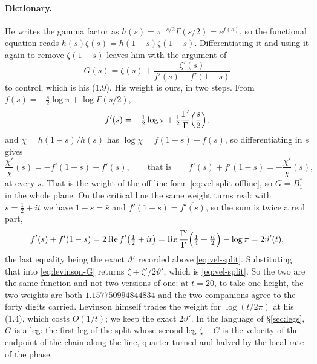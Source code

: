 \documentclass[11pt]{article}
\theoremstyle{definition}
\begin{document}
\paragraph{Dictionary.} He writes the gamma factor as
$h(s)=\pi^{-s/2}\Gamma(s/2)=e^{f(s)}$, so the functional equation reads
$h(s)\zeta(s)=h(1-s)\zeta(1-s)$. Differentiating it and using it again to
remove $\zeta(1-s)$ leaves him with the argument of
\begin{equation}\label{eq:levinson-G}
G(s)=\zeta(s)+\frac{\zeta'(s)}{f'(s)+f'(1-s)}
\end{equation}
to control, which is his (1.9). His weight is ours, in two steps. From
$f(s)=-\tfrac{s}{2}\log\pi+\log\Gamma(s/2)$,
\[
f'(s)=-\tfrac12\log\pi
+\tfrac12\frac{\Gamma'}{\Gamma}\Bigl(\frac{s}{2}\Bigr),
\]
and $\chi=h(1-s)/h(s)$ has $\log\chi=f(1-s)-f(s)$, so differentiating in $s$
gives
\begin{equation}\label{eq:levinson-weight}
\frac{\chi'}{\chi}(s)=-f'(1-s)-f'(s),
\qquad\text{that is}\qquad
f'(s)+f'(1-s)=-\frac{\chi'}{\chi}(s),
\end{equation}
at every $s$. That is the weight of the off-line form
\eqref{eq:vel-split-offline}, so $G=B_1^{\ast}$ in the whole plane. On the
critical line the same weight turns real: with $s=\tfrac12+it$ we have
$1-s=\bar{s}$ and $f'(1-s)=\overline{f'(s)}$, so the sum is twice a real part,
\[
f'(s)+f'(1-s)=2\operatorname{Re}f'\bigl(\tfrac12+it\bigr)
=\operatorname{Re}\frac{\Gamma'}{\Gamma}
\Bigl(\tfrac14+\tfrac{it}{2}\Bigr)-\log\pi
=2\vartheta'(t),
\]
the last equality being the exact $\vartheta'$ recorded above
\eqref{eq:vel-split}. Substituting that into \eqref{eq:levinson-G} returns
$\zeta+\zeta'/2\vartheta'$, which is \eqref{eq:vel-split}. So the two are the
same function and not two versions of one: at $t=20$, to take one height, the
two weights are both $1.157750994844834$ and the two companions agree to the
forty digits carried. Levinson himself trades
the weight for $\log(t/2\pi)$ at his (1.4), which costs $O(1/t)$; we keep the
exact $2\vartheta'$. In the language of \S\ref{sec:legs}, $G$ is a leg: the
first leg of the split whose second leg $\zeta-G$ is the velocity of the
endpoint of the chain along the line, quarter-turned and halved by the local
rate of the phase.
\end{document}
